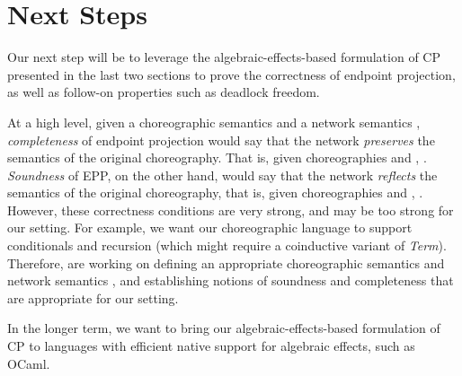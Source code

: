 \section{Next Steps}
\label{sec:next}

Our next step will be to leverage the algebraic-effects-based formulation of CP presented in the last two sections to prove the correctness of endpoint projection, as well as follow-on properties such as deadlock freedom.


At a high level, given a choreographic semantics  and a network semantics , \emph{completeness} of endpoint projection would say that the network \emph{preserves} the semantics of the original choreography. That is, given choreographies  and , .
%
\emph{Soundness} of EPP, on the other hand, would say that the network \emph{reflects} the semantics of the original choreography, that is, given choreographies  and , .
%
However, these correctness conditions are very strong, and may be too strong for our setting.
%
For example, we want our choreographic language to support conditionals and recursion (which might require a coinductive variant of \textit{Term}).
%
Therefore, are working on defining an appropriate choreographic semantics  and network semantics , and establishing notions of soundness and completeness that are appropriate for our setting.

In the longer term, we want to bring our algebraic-effects-based formulation of CP to languages with efficient native support for algebraic effects, such as OCaml. 



